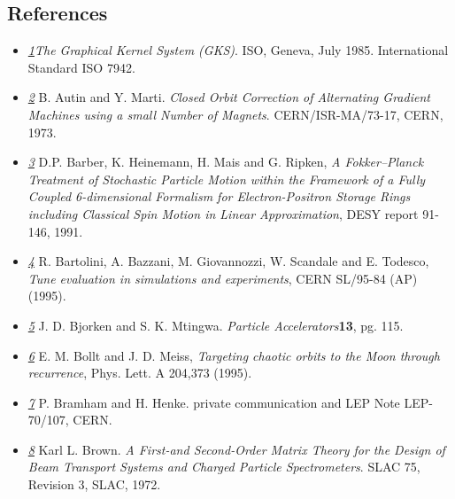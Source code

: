 




\subsection{References}
\begin{itemize}
	\item \href{gks}{\textit{1}}\textit{The Graphical Kernel System (GKS)}. ISO, Geneva, July 1985. International Standard ISO 7942. 


	\item \href{autin}{\textit{2}} B. Autin and Y. Marti. \textit{Closed Orbit Correction of Alternating Gradient Machines   using a small Number of Magnets}. CERN/ISR-MA/73-17, CERN, 1973. 


	\item \href{barber}{\textit{3}} D.P. Barber, K. Heinemann, H. Mais and G. Ripken, \textit{A Fokker--Planck Treatment of Stochastic Particle Motion within   the Framework of a Fully Coupled 6-dimensional Formalism for   Electron-Positron Storage Rings including Classical Spin Motion in   Linear Approximation}, DESY report 91-146, 1991. 


	\item \href{bartolini}{\textit{4}} R. Bartolini, A. Bazzani, M. Giovannozzi, W. Scandale and E. Todesco, \textit{Tune evaluation in simulations and experiments}, CERN SL/95-84 (AP) (1995). 


	\item \href{bjorken}{\textit{5}} J. D. Bjorken and S. K. Mtingwa. \textit{Particle Accelerators}\textbf{13}, pg. 115. 


	\item \href{moon}{\textit{6}} E. M. Bollt and J. D. Meiss, \textit{Targeting chaotic orbits to the Moon through recurrence}, Phys. Lett. A 204,373 (1995). 


	\item \href{bramham}{\textit{7}} P. Bramham and H. Henke. private communication and LEP Note LEP-70/107, CERN. 


	\item \href{slac75}{\textit{8}} Karl L. Brown. \textit{A First-and Second-Order Matrix Theory for the Design   of Beam Transport Systems and Charged Particle Spectrometers}. SLAC 75, Revision 3, SLAC, 1972. 



\end{itemize}
